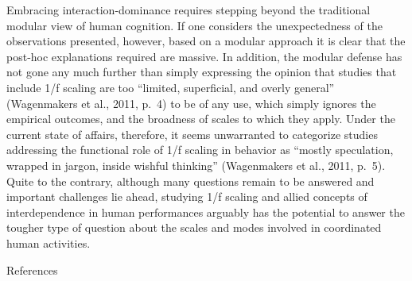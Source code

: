 \documentclass[12pt,]{book}
\begin{document}
Embracing interaction-dominance requires stepping beyond the traditional modular view of human cognition. If one considers the unexpectedness of the observations presented, however, based on a modular approach it is clear that the post-hoc explanations required are massive. In addition, the modular defense has not gone any much further than simply expressing the opinion that studies that include 1/f scaling are too ``limited, superficial, and overly general'' (Wagenmakers et al., 2011, p.~4) to be of any use, which simply ignores the empirical outcomes, and the broadness of scales to which they apply. Under the current state of affairs, therefore, it seems unwarranted to categorize studies addressing the functional role of 1/f scaling in behavior as ``mostly speculation, wrapped in jargon, inside wishful thinking'' (Wagenmakers et al., 2011, p.~5). Quite to the contrary, although many questions remain to be answered and important challenges lie ahead, studying 1/f scaling and allied concepts of interdependence in human performances arguably has the potential to answer the tougher type of question about the scales and modes involved in coordinated human activities.

References
\end{document}
